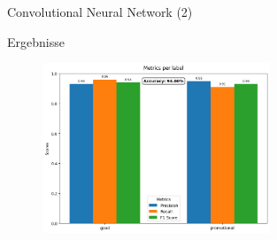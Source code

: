 \documentclass[aspectratio=169]{beamer} %
\begin{document}
\begin{frame}{Convolutional Neural Network (2)}
    \begin{block}{Ergebnisse}
        \begin{figure}
            \centering
            \includegraphics[width=6.8cm]{figures/evaluation_cnnb.png} 
        \end{figure} 
    \end{block}
\end{frame}
\end{document}
